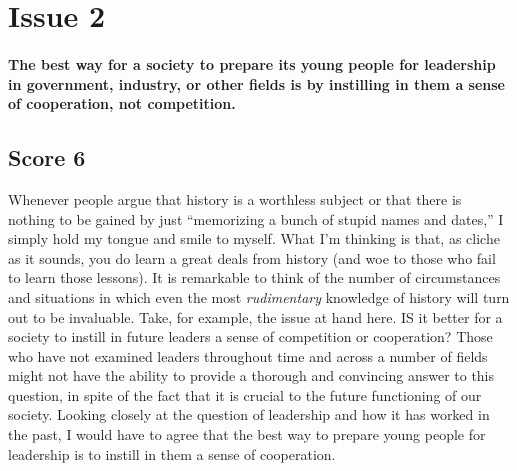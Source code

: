 \section{Issue 2}

\paragraph{The best way for a society to prepare its young people for leadership in government, industry, or other fields is by instilling in them a sense of cooperation, not competition.}

\subsection{Score 6}
Whenever people argue that history is a worthless subject or that there is nothing to be gained by just ``memorizing a bunch of stupid names and dates,'' I simply hold my tongue and smile to myself.
What I'm thinking is that, as cliche as it sounds, you do learn a great deals from history (and woe to those who fail to learn those lessons).
It is remarkable to think of the number of circumstances and situations in which even the most \emph{rudimentary} knowledge of history will turn out to be invaluable.
Take, for example, the issue at hand here.
IS it better for a society to instill in future leaders a sense of competition or cooperation?
Those who have not examined leaders throughout time and across a number of fields might not have the ability to provide a thorough and convincing answer to this question, in spite of the fact that it is crucial to the future functioning of our society.
Looking closely at the question of leadership and how it has worked in the past, I would have to agree that the best way to prepare young people for leadership is to instill in them a sense of cooperation.

